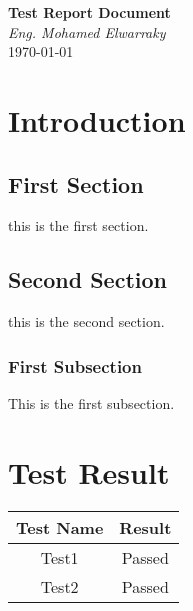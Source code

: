 \documentclass[12pt letterpaper]{report}
\begin{document}
\begin{titlepage}
    \begin{center}
        \large\textbf{Test Report Document} \\
        \large\textit{Eng. Mohamed Elwarraky}\\
        \large\today
    \end{center}

\end{titlepage}

\newpage

\chapter{Introduction}
\section{First Section}
this is the first section.

\section{Second Section}
this is the second section.

\subsection{First Subsection}
This is the first subsection.


\chapter{Test Result}

\begin{center}
    \begin{tabular}{|| c | c ||} \hline
        Test Name & Result \\ \hline \hline
        
            Test1 & Passed \\ \hline
        
            Test2 & Passed \\ \hline
        
    \end{tabular}
\end{center}
\end{document}
